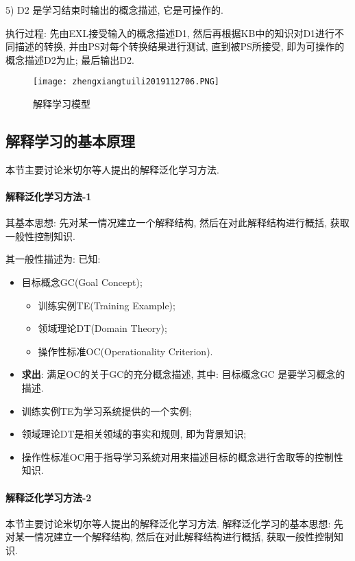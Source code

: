 5) D2 是学习结束时输出的概念描述, 它是可操作的.

执行过程: 先由EXL接受输入的概念描述D1, 然后再根据KB中的知识对D1进行不同描述的转换, 并由PS对每个转换结果进行测试, 直到被PS所接受, 即为可操作的概念描述D2为止; 最后输出D2.

\begin{figure}[H]
\centering
\texttt{[image: zhengxiangtuili2019112706.PNG]}
\caption{解释学习模型}
\label{AI32fig2706}
\end{figure}
\subsection{解释学习的基本原理}
本节主要讨论米切尔等人提出的解释泛化学习方法.
\paragraph{解释泛化学习方法-1}
其基本思想: 先对某一情况建立一个解释结构, 然后在对此解释结构进行概括, 获取一般性控制知识.

其一般性描述为: 已知:
\begin{itemize}
\item 目标概念GC(Goal Concept);
      \begin{itemize}
          \item 训练实例TE(Training Example);
          \item 领域理论DT(Domain Theory);
           \item 操作性标准OC(Operationality Criterion).
       \end{itemize}
\item \textbf{求出}: 满足OC的关于GC的充分概念描述, 其中: 目标概念GC 是要学习概念的描述.
\end{itemize}

\begin{itemize}
\item 训练实例TE为学习系统提供的一个实例;
\item 领域理论DT是相关领域的事实和规则, 即为背景知识;
\item 操作性标准OC用于指导学习系统对用来描述目标的概念进行舍取等的控制性知识.
\end{itemize}
\paragraph{解释泛化学习方法-2}
本节主要讨论米切尔等人提出的解释泛化学习方法.
解释泛化学习的基本思想: 先对某一情况建立一个解释结构, 然后在对此解释结构进行概括, 获取一般性控制知识.

